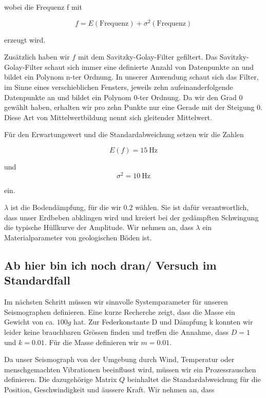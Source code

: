 wobei die Frequenz f mit

\begin{equation}
	f = E(\mathrm{Frequenz}) + \sigma^2(\mathrm{Frequenz})
\end{equation}

erzeugt wird.

Zusätzlich haben wir $f$ mit dem Savitzky-Golay-Filter gefiltert.
Das Savitzky-Golay-Filter schaut sich immer eine definierte Anzahl von Datenpunkte an und bildet ein Polynom n-ter Ordnung. 
In unserer Anwendung schaut sich das Filter, im Sinne eines verschieblichen Fensters, jeweils zehn aufeinanderfolgende Datenpunkte an und bildet ein Polynom 0-ter Ordnung. 
Da wir den Grad 0 gewählt haben, erhalten wir pro zehn Punkte nur eine Gerade mit der Steigung 0. 
Diese Art von Mittelwertbildung nennt sich gleitender Mittelwert.

Für den Erwartungswert und die Standardabweichung setzen wir die Zahlen 

\begin{equation}
E(f) = \SI{15}{\hertz}
\end{equation}

und 
\begin{equation}
\sigma^2 = \SI{10}{\hertz}
\end{equation}

ein.

$\lambda$ ist die Bodendämpfung, für die wir $0.2$ wählen.
Sie ist dafür verantwortlich, dass unser Erdbeben abklingen wird und kreiert bei der gedämpften Schwingung die typische Hüllkurve der Amplitude.
Wir nehmen an, dass $\lambda$ ein Materialparameter von geologischen Böden ist.

\subsection{Ab hier bin ich noch dran/ Versuch im Standardfall}
Im nächsten Schritt müssen wir sinnvolle Systemparameter für unseren Seismographen definieren.
Eine kurze Recherche zeigt, dass die Masse ein Gewicht von ca. $100 g$ hat.
Zur Federkonstante D und Dämpfung k konnten wir leider keine brauchbaren Grössen finden und treffen die Annahme, dass $D = 1$ und $k = 0.01$.
Für die Masse definieren wir $m = 0.01$.

Da unser Seismograph von der Umgebung durch Wind, Temperatur oder menschgemachten Vibrationen beeinflusst wird, müssen wir ein Prozessrauschen definieren.
Die dazugehörige Matrix $Q$ beinhaltet die Standardabweichung für die Position, Geschwindigkeit und äussere Kraft.
Wir nehmen an, dass


